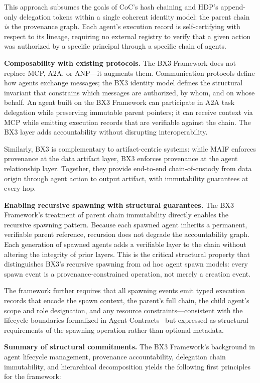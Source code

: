 This approach subsumes the goals of CoC's hash chaining and HDP's append-only delegation tokens within a single coherent identity model: the parent chain \textit{is} the provenance graph. Each agent's execution record is self-certifying with respect to its lineage, requiring no external registry to verify that a given action was authorized by a specific principal through a specific chain of agents.

\textbf{Composability with existing protocols.} The BX3 Framework does not replace MCP, A2A, or ANP---it augments them. Communication protocols define how agents exchange messages; the BX3 identity model defines the structural invariant that constrains which messages are authorized, by whom, and on whose behalf. An agent built on the BX3 Framework can participate in A2A task delegation while preserving immutable parent pointers; it can receive context via MCP while emitting execution records that are verifiable against the chain. The BX3 layer adds accountability without disrupting interoperability.

Similarly, BX3 is complementary to artifact-centric systems: while MAIF enforces provenance at the data artifact layer, BX3 enforces provenance at the agent relationship layer. Together, they provide end-to-end chain-of-custody from data origin through agent action to output artifact, with immutability guarantees at every hop.

\textbf{Enabling recursive spawning with structural guarantees.} The BX3 Framework's treatment of parent chain immutability directly enables the recursive spawning pattern. Because each spawned agent inherits a permanent, verifiable parent reference, recursion does not degrade the accountability graph. Each generation of spawned agents adds a verifiable layer to the chain without altering the integrity of prior layers. This is the critical structural property that distinguishes BX3's recursive spawning from ad hoc agent spawn models: every spawn event is a provenance-constrained operation, not merely a creation event.

The framework further requires that all spawning events emit typed execution records that encode the spawn context, the parent's full chain, the child agent's scope and role designation, and any resource constraints---consistent with the lifecycle boundaries formalized in Agent Contracts~\cite{agentcontracts2025} but expressed as structural requirements of the spawning operation rather than optional metadata.

\textbf{Summary of structural commitments.} The BX3 Framework's background in agent lifecycle management, provenance accountability, delegation chain immutability, and hierarchical decomposition yields the following first principles for the framework:

